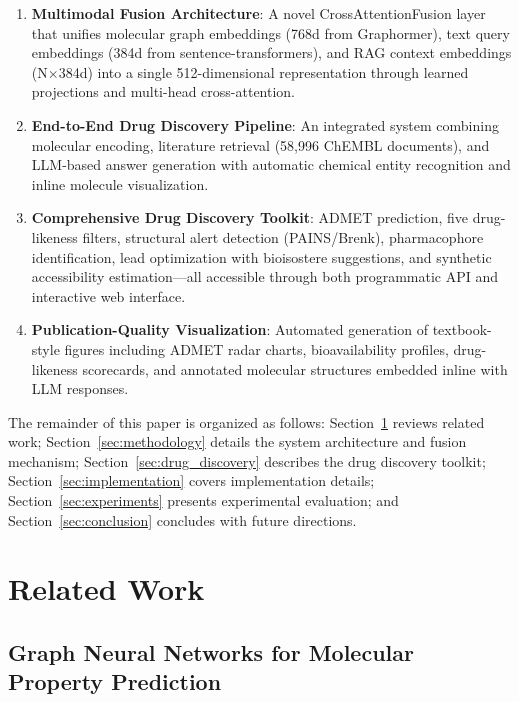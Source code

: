 \documentclass[conference]{IEEEtran}
\begin{document}
\begin{enumerate}[leftmargin=*]
    \item \textbf{Multimodal Fusion Architecture}: A novel CrossAttentionFusion layer that unifies molecular graph embeddings (768d from Graphormer), text query embeddings (384d from sentence-transformers), and RAG context embeddings (N$\times$384d) into a single 512-dimensional representation through learned projections and multi-head cross-attention.
    
    \item \textbf{End-to-End Drug Discovery Pipeline}: An integrated system combining molecular encoding, literature retrieval (58,996 ChEMBL documents), and LLM-based answer generation with automatic chemical entity recognition and inline molecule visualization.
    
    \item \textbf{Comprehensive Drug Discovery Toolkit}: ADMET prediction, five drug-likeness filters, structural alert detection (PAINS/Brenk), pharmacophore identification, lead optimization with bioisostere suggestions, and synthetic accessibility estimation---all accessible through both programmatic API and interactive web interface.
    
    \item \textbf{Publication-Quality Visualization}: Automated generation of textbook-style figures including ADMET radar charts, bioavailability profiles, drug-likeness scorecards, and annotated molecular structures embedded inline with LLM responses.
\end{enumerate}

The remainder of this paper is organized as follows: Section~\ref{sec:related} reviews related work; Section~\ref{sec:methodology} details the system architecture and fusion mechanism; Section~\ref{sec:drug_discovery} describes the drug discovery toolkit; Section~\ref{sec:implementation} covers implementation details; Section~\ref{sec:experiments} presents experimental evaluation; and Section~\ref{sec:conclusion} concludes with future directions.

\section{Related Work}
\label{sec:related}

\subsection{Graph Neural Networks for Molecular Property Prediction}
\end{document}
